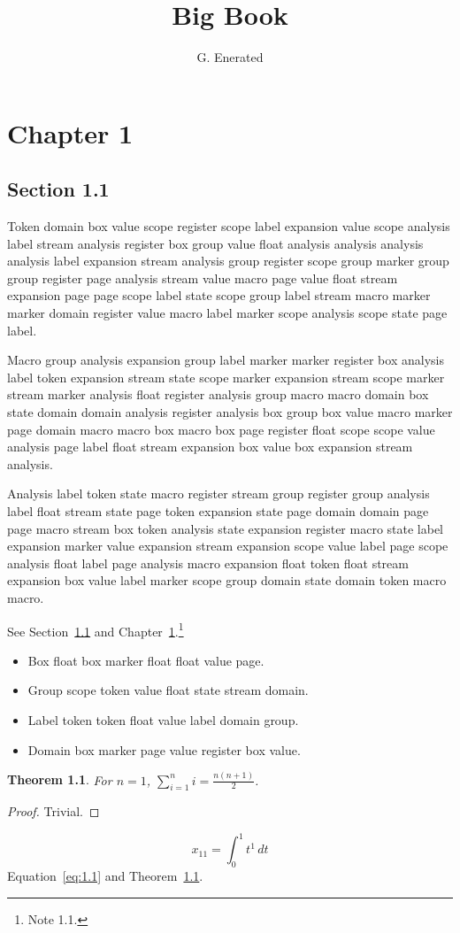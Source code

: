 \documentclass[11pt,twoside]{book}
\newtheorem{theorem}{Theorem}[chapter]
\begin{document}
\frontmatter\title{Big Book}\author{G. Enerated}\maketitle\tableofcontents\listoffigures\listoftables\mainmatter
\chapter{Chapter 1}\label{ch:1}
\section{Section 1.1}\label{sec:1.1}
Token domain box value scope register scope label expansion value scope analysis label stream analysis register box group value float analysis analysis analysis analysis label expansion stream analysis group register scope group marker group group register page analysis stream value macro page value float stream expansion page page scope label state scope group label stream macro marker marker domain register value macro label marker scope analysis scope state page label.

Macro group analysis expansion group label marker marker register box analysis label token expansion stream state scope marker expansion stream scope marker stream marker analysis float register analysis group macro macro domain box state domain domain analysis register analysis box group box value macro marker page domain macro macro box macro box page register float scope scope value analysis page label float stream expansion box value box expansion stream analysis.

Analysis label token state macro register stream group register group analysis label float stream state page token expansion state page domain domain page page macro stream box token analysis state expansion register macro state label expansion marker value expansion stream expansion scope value label page scope analysis float label page analysis macro expansion float token float stream expansion box value label marker scope group domain state domain token macro macro.

See Section~\ref{sec:1.1} and Chapter~\ref{ch:1}.\footnote{Note 1.1.}
\begin{itemize}\item Box float box marker float float value page.\item Group scope token value float state stream domain.\item Label token token float value label domain group.\item Domain box marker page value register box value.\end{itemize}
\begin{theorem}\label{thm:1.1}For $n=1$, $\sum_{i=1}^{n}i=\frac{n(n+1)}{2}$.\end{theorem}\begin{proof}Trivial.\end{proof}
\begin{equation}x_{11}=\int_0^{1}t^{1}\,dt\label{eq:1.1}\end{equation} Equation~\eqref{eq:1.1} and Theorem~\ref{thm:1.1}.
\end{document}
